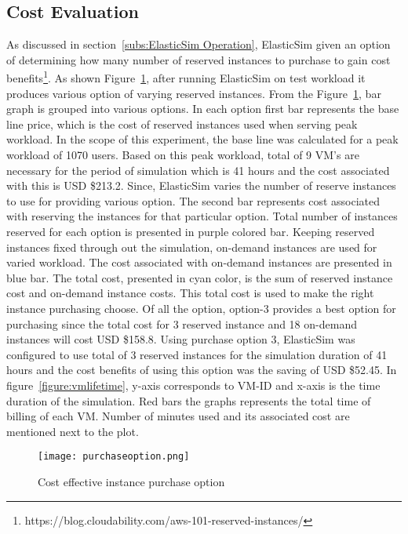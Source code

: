 \subsection{Cost Evaluation}
\label{sub:Cost Evaluation}
As discussed in section~\ref{subs:ElasticSim Operation}, ElasticSim given an option of determining how many number of reserved instances to purchase to gain cost benefits\footnote{https://blog.cloudability.com/aws-101-reserved-instances/}. As shown Figure~\ref{figure:purchaseoption}, after running ElasticSim on test workload it produces various option of varying reserved instances. From the Figure~\ref{figure:purchaseoption}, bar graph is grouped into various options. In each option first bar represents the base line price, which is the cost of reserved instances used when serving peak workload. In the scope of this experiment, the base line was calculated for a peak workload of 1070 users. Based on this peak workload, total of 9 VM's are necessary for the period of simulation which is 41 hours and the cost associated with this is USD \$213.2. Since, ElasticSim varies the number of reserve instances to use for providing various option. The second bar represents cost associated with reserving the instances for that particular option. Total number of instances reserved for each option is presented in purple colored bar. Keeping reserved instances fixed through out the simulation, on-demand instances are used for varied workload. The cost associated with on-demand instances are presented in blue bar. The total cost, presented in cyan color, is the sum of reserved instance cost and on-demand instance costs. This total cost is used to make the right instance purchasing choose. Of all the option, option-3 provides a best option for purchasing since the total cost for 3 reserved instance and 18 on-demand instances will cost USD \$158.8. Using purchase option 3, ElasticSim was configured to use total of 3 reserved instances for the simulation duration of 41 hours and the cost benefits of using this option was the saving of USD \$52.45. In figure~\ref{figure:vmlifetime}, y-axis corresponds to VM-ID and x-axis is the time duration of the simulation. Red bars the graphs represents the total time of billing of each VM. Number of minutes used and its associated cost are mentioned next to the plot.
\begin{figure}[h]
  \begin{center}
    \texttt{[image: purchaseoption.png]}
    \caption{Cost effective instance purchase option}
    \label{figure:purchaseoption}
  \end{center}
\end{figure}


